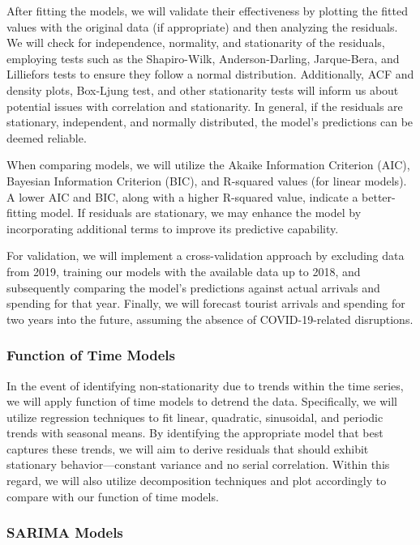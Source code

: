 \documentclass[11pt]{article}
\begin{document}
After fitting the models, we will validate their effectiveness by plotting the fitted values with the original data (if appropriate) and then analyzing the residuals. We will check for independence, normality, and stationarity of the residuals, employing tests such as the Shapiro-Wilk, Anderson-Darling, Jarque-Bera, and Lilliefors tests to ensure they follow a normal distribution. Additionally, ACF and density plots, Box-Ljung test, and other stationarity tests will inform us about potential issues with correlation and stationarity. In general, if the residuals are stationary, independent, and normally distributed, the model's predictions can be deemed reliable.

When comparing models, we will utilize the Akaike Information Criterion (AIC), Bayesian Information Criterion (BIC), and R-squared values (for linear models). A lower AIC and BIC, along with a higher R-squared value, indicate a better-fitting model. If residuals are stationary, we may enhance the model by incorporating additional terms to improve its predictive capability.

For validation, we will implement a cross-validation approach by excluding data from 2019, training our models with the available data up to 2018, and subsequently comparing the model's predictions against actual arrivals and spending for that year. Finally, we will forecast tourist arrivals and spending for two years into the future, assuming the absence of COVID-19-related disruptions.

\subsubsection{Function of Time Models}

In the event of identifying non-stationarity due to trends within the time series, we will apply function of time models to detrend the data. Specifically, we will utilize regression techniques to fit linear, quadratic, sinusoidal, and periodic trends with seasonal means. By identifying the appropriate model that best captures these trends, we will aim to derive residuals that should exhibit stationary behavior---constant variance and no serial correlation. Within this regard, we will also utilize decomposition techniques and plot accordingly to compare with our function of time models.

\subsubsection{SARIMA Models}
\end{document}
